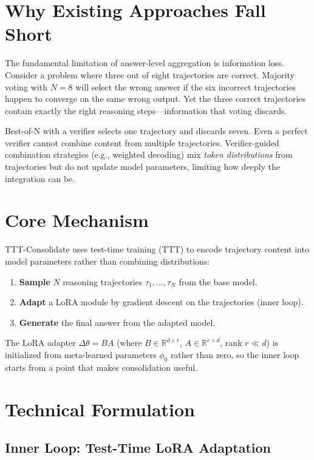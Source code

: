 \documentclass[10pt,twocolumn]{article}
\begin{document}
\section{Why Existing Approaches Fall Short}

The fundamental limitation of answer-level aggregation is information loss.
Consider a problem where three out of eight trajectories are correct.
Majority voting with $N=8$ will select the wrong answer if the six incorrect trajectories happen to converge on the same wrong output.
Yet the three correct trajectories contain exactly the right reasoning steps---information that voting discards.

Best-of-N with a verifier selects one trajectory and discards seven.
Even a perfect verifier cannot combine content from multiple trajectories.
Verifier-guided combination strategies (e.g., weighted decoding) mix \emph{token distributions} from trajectories but do not update model parameters, limiting how deeply the integration can be.

\section{Core Mechanism}

TTT-Consolidate uses test-time training (TTT) to encode trajectory content into model parameters rather than combining distributions:

\begin{enumerate}[leftmargin=1.5em,itemsep=2pt]
  \item \textbf{Sample} $N$ reasoning trajectories $\tau_1,\ldots,\tau_N$ from the base model.
  \item \textbf{Adapt} a LoRA module by gradient descent on the trajectories (inner loop).
  \item \textbf{Generate} the final answer from the adapted model.
\end{enumerate}

The LoRA adapter $\Delta\theta = BA$ (where $B \in \mathbb{R}^{d\times r}$, $A \in \mathbb{R}^{r\times d}$, rank $r \ll d$) is initialized from meta-learned parameters $\phi_0$ rather than zero, so the inner loop starts from a point that makes consolidation useful.

\section{Technical Formulation}

\subsection*{Inner Loop: Test-Time LoRA Adaptation}
\end{document}
